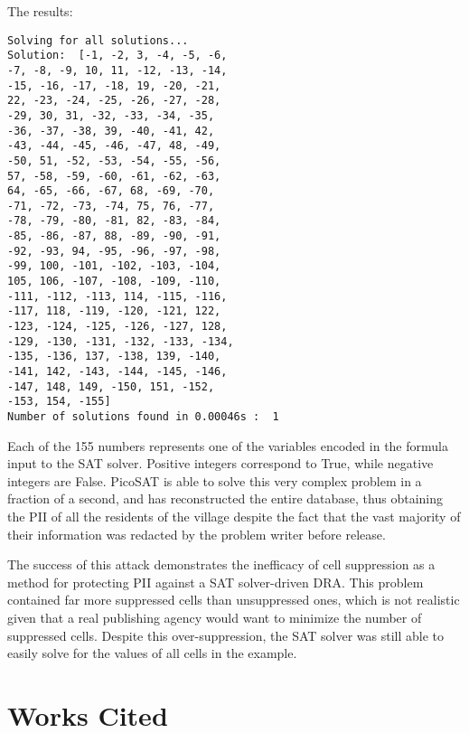 \documentclass[jou,apacite]{apa6}
\begin{document}
The results:

\begin{verbatim}
Solving for all solutions...
Solution:  [-1, -2, 3, -4, -5, -6,
-7, -8, -9, 10, 11, -12, -13, -14,
-15, -16, -17, -18, 19, -20, -21,
22, -23, -24, -25, -26, -27, -28,
-29, 30, 31, -32, -33, -34, -35,
-36, -37, -38, 39, -40, -41, 42,
-43, -44, -45, -46, -47, 48, -49,
-50, 51, -52, -53, -54, -55, -56,
57, -58, -59, -60, -61, -62, -63,
64, -65, -66, -67, 68, -69, -70,
-71, -72, -73, -74, 75, 76, -77,
-78, -79, -80, -81, 82, -83, -84,
-85, -86, -87, 88, -89, -90, -91,
-92, -93, 94, -95, -96, -97, -98,
-99, 100, -101, -102, -103, -104,
105, 106, -107, -108, -109, -110,
-111, -112, -113, 114, -115, -116,
-117, 118, -119, -120, -121, 122,
-123, -124, -125, -126, -127, 128,
-129, -130, -131, -132, -133, -134,
-135, -136, 137, -138, 139, -140,
-141, 142, -143, -144, -145, -146,
-147, 148, 149, -150, 151, -152,
-153, 154, -155]
Number of solutions found in 0.00046s :  1
\end{verbatim}
Each of the 155 numbers represents one of the variables encoded in the formula input to the SAT solver.
Positive integers correspond to True, while negative integers are False.
PicoSAT is able to solve this very complex problem in a fraction of a second, and has reconstructed the entire database, thus obtaining the PII of all the residents of the village despite the fact that the vast majority of their information was redacted by the problem writer before release.

The success of this attack demonstrates the inefficacy of
cell suppression as a method for protecting PII against
a SAT solver-driven DRA. This problem
contained far more suppressed cells than unsuppressed ones, which is
not realistic given that a real publishing agency would want to minimize
the number of suppressed cells. Despite this over-suppression,
the SAT solver was still able to easily solve for the values of all cells in the example.

\section{Works Cited}
\end{document}
